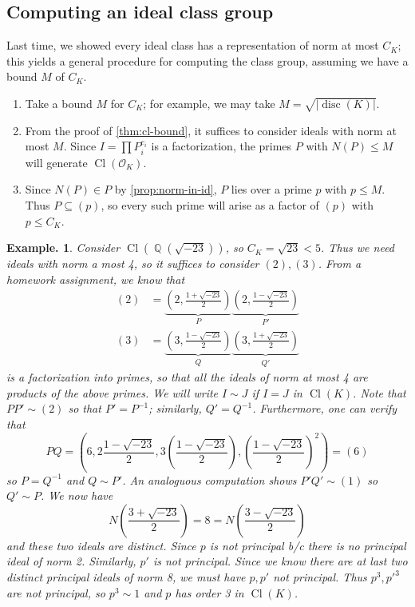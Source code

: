 \documentclass[11pt, a4paper]{memoir}
\DeclareMathOperator{\Q}{{\mathbb{Q}}}
\theoremstyle{change}
\theoremstyle{plain}
\theoremstyle{nonumberplain}
\newtheorem{example}{Example.}
\DeclareMathOperator{\disc}{disc}
\DeclareMathOperator{\Cl}{Cl}
\numberwithin{equation}{section}
\begin{document}
\subsection{Computing an ideal class group}
Last time, we showed every ideal class has a representation of norm at most $C_K$; this yields a general procedure for computing the class group, assuming we have a bound $M$ of $C_K$.
\begin{enumerate}[nl]
    \item Take a bound $M$ for $C_K$; for example, we may take $M=\sqrt{|\disc(K)|}$.
    \item From the proof of \cref{thm:cl-bound}, it suffices to consider ideals with norm at most $M$.
        Since $I=\prod P_i^{e_i}$ is a factorization, the primes $P$ with $N(P)\leq M$ will generate $\Cl(\mathcal{O}_K)$.
    \item Since $N(P)\in P$ by \cref{prop:norm-in-id}, $P$ lies over a prime $p$ with $p\leq M$.
        Thus $P\subseteq (p)$, so every such prime will arise as a factor of $(p)$ with $p\leq C_K$.
\end{enumerate}
\begin{example}
    Consider $\Cl(\Q(\sqrt{-23}))$, so $C_K=\sqrt{23}<5$.
    Thus we need ideals with norm a most 4, so it suffices to consider $(2),(3)$.
    From a homework assignment, we know that
    \begin{align*}
        (2)&=\underbrace{\left(2,\frac{1+\sqrt{-23}}{2}\right)}_{P}\underbrace{\left(2,\frac{1-\sqrt{-23}}{2}\right)}_{P'}\\
        (3)&=\underbrace{\left(3,\frac{1-\sqrt{-23}}{2}\right)}_{Q}\underbrace{\left(3,\frac{1+\sqrt{-23}}{2}\right)}_{Q'}
    \end{align*}
    is a factorization into primes, so that all the ideals of norm at most 4 are products of the above primes.
    We will write  $I\sim J$ if $I=J$ in $\Cl(K)$.
    Note that $PP'\sim(2)$ so that $P'=P^{-1}$; similarly, $Q'=Q^{-1}$.
    Furthermore, one can verify that
    \begin{equation*}
        PQ=\left(6,2\frac{1-\sqrt{-23}}{2},3\left(\frac{1-\sqrt{-23}}{2}\right),\left(\frac{1-\sqrt{-23}}{2}\right)^2\right)=(6)
    \end{equation*}
    so $P=Q^{-1}$ and $Q\sim P'$.
    An analoguous computation shows $P'Q'\sim(1)$ so $Q'\sim P$.
    We now have
    \begin{equation*}
        N\left(\frac{3+\sqrt{-23}}{2}\right)=8=N\left(\frac{3-\sqrt{-23}}{2}\right)
    \end{equation*}
    and these two ideals are distinct.
    Since $p$ is not principal b/c there is no principal ideal of norm 2.
    Similarly, $p'$ is not principal.
    Since we know there are at last two distinct principal ideals of norm 8, we must have $p,p'$ not principal.
    Thus $p^3,p'^3$ are not principal, so $p^3\sim 1$ and $p$ has order 3 in $\Cl(K)$.
\end{example}
\end{document}
